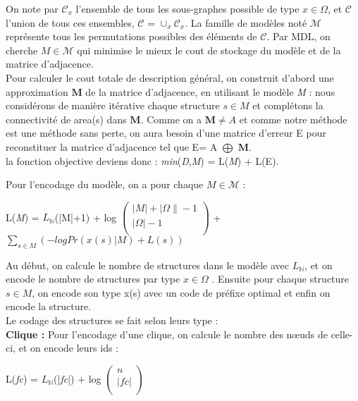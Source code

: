 On note par $\mathcal{C}_{x}$ l'ensemble de tous les sous-graphes possible de type $x \in \Omega$, et $\mathcal{C}$ l'union de tous ces ensembles, $\mathcal{C}$ = ${\cup}_{x}\mathcal{C}_{x}$. La famille de modèles noté $\mathcal{M}$ représente tous les permutations possibles des éléments de $\mathcal{C}$. Par MDL, on cherche $\textit{M} \in \mathcal{M}$ qui minimise le mieux le cout de stockage du modèle et de la matrice d'adjacence.\\
Pour calculer le cout totale de description général, on construit d'abord une approximation $\mathbf{M}$ de la matrice d'adjacence, en utilisant le modèle \textit{M} : nous considérons de manière itérative chaque structure $s \in  \textit{M}$ et complétons la connectivité de area(s) dans $\mathbf{M}$. Comme on a $ \mathbf{M} \neq  A$ et comme notre méthode est une méthode sans perte, on aura besoin d'une matrice d'erreur E pour reconstituer la matrice d'adjacence tel que E= A $\bigoplus$ $\mathbf{M} $.\\
la fonction objective deviens donc :
 \textit{min}(\textit{D},\textit{M}) = L(\textit{M}) + L(E).

Pour l'encodage du modèle, on a pour chaque $\textit{M} \in  \mathcal{M}$ : 

\begin{center}
L(\textit{M}) = $L_{\mathbb{N}}$(|M|+1) + log $\left( \begin{array}{c}
|\textit{M}| + |\Omega\| -1 \\
|\Omega| -1 \\
\end{array} \right)$ + $\sum\limits_{s  \in \textit{M}} ( - log Pr(x(s)  |  \textit{M} ) + L(s) )$\\
\end{center}

Au début, on calcule le nombre de structures dans le modèle avec $L_{\mathbb{N}}$, et on encode le nombre de structures par type $x \in \Omega$ . Ensuite pour chaque structure $s \in \textit{M}$, on encode son type x(s) avec un code de préfixe optimal et enfin on encode la structure.\\
Le codage des structures se fait selon leurs type :\\
\textbf{Clique :} Pour l'encodage d'une clique, on calcule le nombre des nœuds de celle-ci, et on encode leurs ids :

\begin{center}
L(\textit{fc}) = $L_{\mathbb{N}}$(|\textit{fc}|) + log $\left( \begin{array}{c}
n \\
|\textit{fc}| \\
\end{array} \right)$ \\
\end{center}

